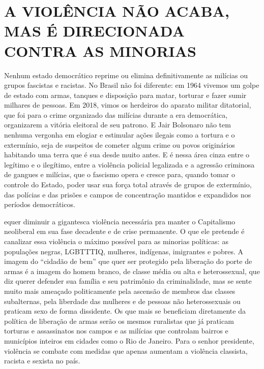\section{A VIOLÊNCIA NÃO ACABA, MAS É DIRECIONADA CONTRA AS MINORIAS}

Nenhum estado democrático reprime ou elimina definitivamente as milícias ou grupos fascistas e racistas. No Brasil não foi diferente: em 1964 vivemos um golpe de estado com armas, tanques e disposição para matar, torturar e fazer sumir milhares de pessoas. Em 2018, vimos os herdeiros do aparato militar ditatorial, que foi para o crime organizado das milícias durante a era democrática, organizarem a vitória eleitoral de seu patrono. E Jair Bolsonaro não tem nenhuma vergonha em elogiar e estimular ações ilegais como a tortura e o extermínio, seja de suspeitos de cometer algum crime ou povos originários habitando uma terra que é sua desde muito antes. E é nessa área cinza entre o legítimo e o ilegítimo, entre a violência policial legalizada e a agressão criminosa de gangues e milícias, que o fascismo opera e cresce para, quando tomar o controle do Estado, poder usar sua força total através de grupos de extermínio, das polícias e das prisões e campos de concentração mantidos e expandidos nos períodos democráticos.

equer diminuir a gigantesca violência necessária pra manter o Capitalismo neoliberal em sua fase decadente e de crise permanente. O que ele pretende é canalizar essa violência o máximo possível para as minorias políticas: as populações negras, LGBTTTIQ, mulheres, indígenas, imigrantes e pobres. A imagem do “cidadão de bem” que quer ser protegido pela liberação do porte de armas é a imagem do homem branco, de classe média ou alta e heterossexual, que diz querer defender sua família e seu patrimônio da criminalidade, mas se sente muito mais ameaçado politicamente pela ascensão de membros das classes subalternas, pela liberdade das mulheres e de pessoas não heterossexuais ou praticam sexo de forma dissidente. Os que mais se beneficiam diretamente da política de liberação de armas serão os mesmos ruralistas que já praticam torturas e assassinatos nos campos e as milícias que controlam bairros e municípios inteiros em cidades como o Rio de Janeiro. Para o senhor presidente, violência se combate com medidas que apenas aumentam a violência classista, racista e sexista no país.

